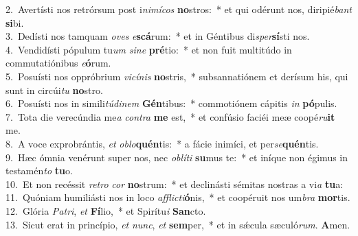 {2.~}Avertísti nos retrórsum post i\textit{ni}\textit{mí}\textit{cos} \textbf{no}stros:~* et qui odérunt nos, diripié\textit{bant} \textbf{si}bi.\\
{3.~}Dedísti nos tamquam \textit{o}\textit{ves} \textit{e}\textbf{scá}rum:~* et in Géntibus di\textit{sper}\textbf{sí}sti nos.\\
{4.~}Vendidísti pópulum tu\textit{um} \textit{si}\textit{ne} \textbf{pré}tio:~* et non fuit multitúdo in commutatiónibus \textit{e}\textbf{ó}rum.\\
{5.~}Posuísti nos oppróbrium \textit{vi}\textit{cí}\textit{nis} \textbf{no}stris,~* subsannatiónem et derísum his, qui sunt in circúi\textit{tu} \textbf{no}stro.\\
{6.~}Posuísti nos in simili\textit{tú}\textit{di}\textit{nem} \textbf{Gén}tibus:~* commotiónem cápitis \textit{in} \textbf{pó}pulis.\\
{7.~}Tota die verecúndia me\textit{a} \textit{con}\textit{tra} \textbf{me} est,~* et confúsio faciéi meæ coopé\textit{ru}\textbf{it} me.\\
{8.~}A voce exprobrántis, \textit{et} \textit{o}\textit{blo}\textbf{quén}tis:~* a fácie inimíci, et per\textit{se}\textbf{quén}tis.\\
{9.~}Hæc ómnia venérunt super nos, nec \textit{o}\textit{blí}\textit{ti} \textbf{su}mus te:~* et iníque non égimus in testamén\textit{to} \textbf{tu}o.\\
{10.~}Et non recéssit \textit{re}\textit{tro} \textit{cor} \textbf{no}strum:~* et declinásti sémitas nostras a vi\textit{a} \textbf{tu}a:\\
{11.~}Quóniam humiliásti nos in loco \textit{af}\textit{fli}\textit{cti}\textbf{ó}nis,~* et coopéruit nos um\textit{bra} \textbf{mor}tis.\\
{12.~}Glória \textit{Pa}\textit{tri}, \textit{et} \textbf{Fí}lio,~* et Spirítu\textit{i} \textbf{San}cto.\\
{13.~}Sicut erat in princípio, \textit{et} \textit{nunc}, \textit{et} \textbf{sem}per,~* et in sǽcula sæculó\textit{rum}. \textbf{A}men.\\
